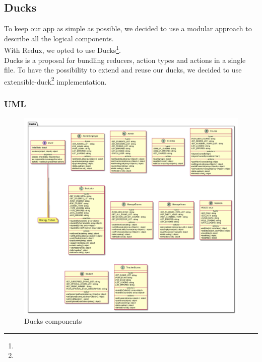 
	\subsection{Ducks}
	To keep our app as simple as possible, we decided to use a modular approach to describe all the logical components.\\
	With Redux, we opted to use Ducks\footnote{}.\\
	Ducks is a proposal for bundling reducers, action types and actions in a single file. To have the possibility to extend and reuse our ducks, we decided to use extensible-duck\footnote{} implementation.
	\subsubsection{UML}
	\begin{figure}[H]
		\centering
		\includegraphics[width=1\linewidth]{"../diagrammi/redux/ducks"}
		\caption{Ducks components}
		\label{fig:Ducks components}
	\end{figure}
